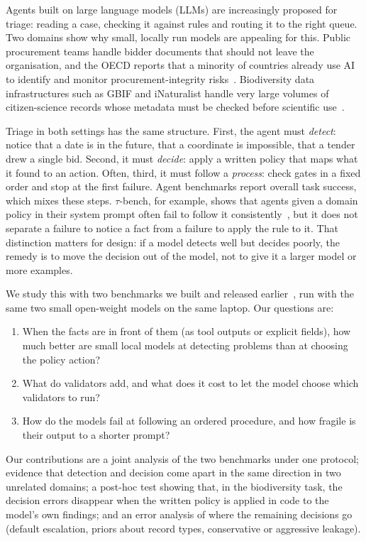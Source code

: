 \documentclass[11pt,a4paper]{article}
\begin{document}
Agents built on large language models (LLMs) are increasingly proposed for triage: reading a case, checking it
against rules and routing it to the right queue. Two domains show why small, locally run models are appealing
for this. Public procurement teams handle bidder documents that should not leave the organisation, and the OECD
reports that a minority of countries already use AI to identify and monitor procurement-integrity
risks~\cite{oecd2026integrity}. Biodiversity data infrastructures such as GBIF and iNaturalist handle very large
volumes of citizen-science records whose metadata must be checked before scientific
use~\cite{gbif2026issues,inat2026dqa,campbell2023identifiers}.

Triage in both settings has the same structure. First, the agent must \emph{detect}: notice that a date is in
the future, that a coordinate is impossible, that a tender drew a single bid. Second, it must \emph{decide}:
apply a written policy that maps what it found to an action. Often, third, it must follow a \emph{process}: check
gates in a fixed order and stop at the first failure. Agent benchmarks report overall task success, which mixes
these steps. $\tau$-bench, for example, shows that agents given a domain policy in their system prompt often fail
to follow it consistently~\cite{yao2024tau}, but it does not separate a failure to notice a fact from a failure
to apply the rule to it. That distinction matters for design: if a model detects well but decides poorly, the
remedy is to move the decision out of the model, not to give it a larger model or more examples.

We study this with two benchmarks we built and released earlier~\cite{hussain2026ecorecord,hussain2026procuregate},
run with the same two small open-weight models on the same laptop. Our questions are:

\begin{enumerate}
  \item When the facts are in front of them (as tool outputs or explicit fields), how much better are small local
  models at detecting problems than at choosing the policy action?
  \item What do validators add, and what does it cost to let the model choose which validators to run?
  \item How do the models fail at following an ordered procedure, and how fragile is their output to a shorter
  prompt?
\end{enumerate}

Our contributions are a joint analysis of the two benchmarks under one protocol; evidence that detection and
decision come apart in the same direction in two unrelated domains; a post-hoc test showing that, in the
biodiversity task, the decision errors disappear when the written policy is applied in code to the model's own
findings; and an error analysis of where the remaining decisions go (default escalation, priors about record
types, conservative or aggressive leakage).
\end{document}
